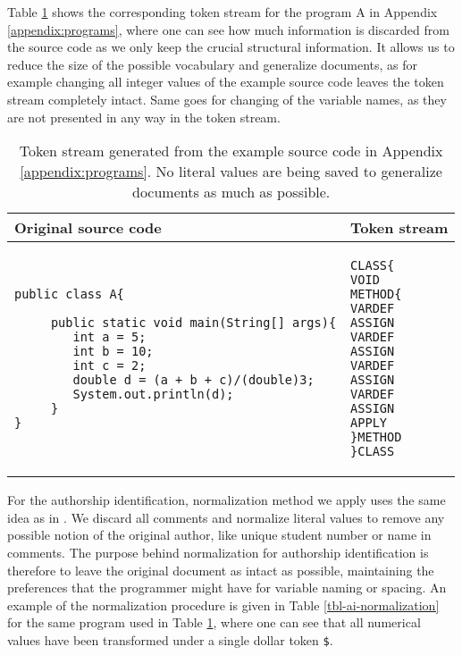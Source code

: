 Table \ref{tbl-token-stream} shows the corresponding token stream for the program A in Appendix \ref{appendix:programs}, where one can see how much information is discarded from the source code as we only keep the crucial structural information. It allows us to reduce the size of the possible vocabulary and generalize documents, as for example changing all integer values of the example source code leaves the token stream completely intact. Same goes for changing of the variable names, as they are not presented in any way in the token stream. 

\begin{table}[ht]
\centering
\caption{Token stream generated from the example source code in Appendix \ref{appendix:programs}. No literal values are being saved to generalize documents as much as possible.}
\label{tbl-token-stream}
\begin{tabular}{|l|l|} \hline
\bf Original source code & \bf Token stream \\ \hline
\begin{lstlisting}
public class A{

     public static void main(String[] args){
        int a = 5;
        int b = 10;
        int c = 2;
        double d = (a + b + c)/(double)3;
        System.out.println(d);
     }
}
\end{lstlisting}                     &

\begin{lstlisting}
CLASS{  
VOID    
METHOD{ 
VARDEF 
ASSIGN  
VARDEF 
ASSIGN  
VARDEF 
ASSIGN  
VARDEF 
ASSIGN  
APPLY   
}METHOD 
}CLASS
\end{lstlisting}
\\ \hline      
\end{tabular}
\end{table}

\newpage

For the authorship identification, normalization method we apply uses the same idea as in \cite{AIRTSCAA2009, SCANG2007}. We discard all comments and normalize literal values to remove any possible notion of the original author, like unique student number or name in comments. The purpose behind normalization for authorship identification is therefore to leave the original document as intact as possible, maintaining the preferences that the programmer might have for variable naming or spacing. An example of the normalization procedure is given in Table \ref{tbl-ai-normalization} for the same program used in Table \ref{tbl-token-stream}, where one can see that all numerical values have been transformed under a single dollar token \texttt{\$}.

